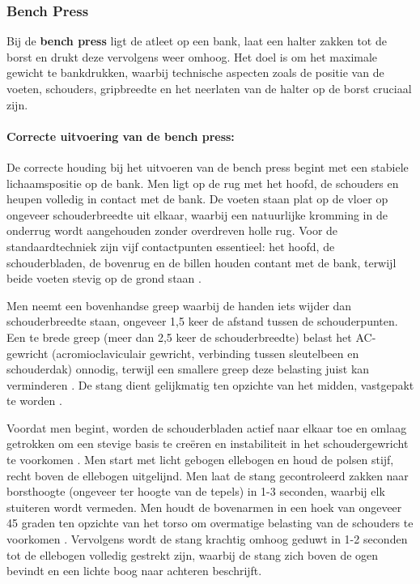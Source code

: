 \subsubsection{Bench Press}
\label{subsubsec:bench-press}
Bij de \textbf{bench press} ligt de atleet op een bank, laat een halter zakken tot de borst en drukt deze vervolgens weer omhoog. 
Het doel is om het maximale gewicht te bankdrukken, waarbij technische aspecten zoals de positie van de voeten, schouders, gripbreedte en het neerlaten van de halter op de borst cruciaal zijn.

\paragraph{Correcte uitvoering van de bench press:}
De correcte houding bij het uitvoeren van de bench press begint met een stabiele lichaamspositie op de bank. 
Men ligt op de rug met het hoofd, de schouders en heupen volledig in contact met de bank. 
De voeten staan plat op de vloer op ongeveer schouderbreedte uit elkaar, waarbij een natuurlijke kromming in de onderrug wordt aangehouden zonder overdreven holle rug. 
Voor de standaardtechniek zijn vijf contactpunten essentieel: het hoofd, de schouderbladen, de bovenrug en de billen houden contant met de bank, terwijl beide voeten stevig op de grond staan \autocite{KrolEtAl2010}.

\medskip

Men neemt een bovenhandse greep waarbij de handen iets wijder dan schouderbreedte staan, ongeveer 1,5 keer de afstand tussen de schouderpunten. 
Een te brede greep (meer dan 2,5 keer de schouderbreedte) belast het AC-gewricht (acromioclaviculair gewricht, verbinding tussen sleutelbeen en schouderdak) onnodig, terwijl een smallere greep deze belasting juist kan verminderen \autocite{Ronai2018}. 
De stang dient gelijkmatig ten opzichte van het midden, vastgepakt te worden \autocite{KrolEtAl2010}.

\medskip

Voordat men begint, worden de schouderbladen actief naar elkaar toe en omlaag getrokken om een stevige basis te creëren en instabiliteit in het schoudergewricht te voorkomen \autocite{NoteboomEtAl2024}. 
Men start met licht gebogen ellebogen en houd de polsen stijf, recht boven de ellebogen uitgelijnd. 
Men laat de stang gecontroleerd zakken naar borsthoogte (ongeveer ter hoogte van de tepels) in 1-3 seconden, waarbij elk stuiteren wordt vermeden. 
Men houdt de bovenarmen in een hoek van ongeveer 45 graden ten opzichte van het torso om overmatige belasting van de schouders te voorkomen \autocite{Ronai2018}. 
Vervolgens wordt de stang krachtig omhoog geduwt in 1-2 seconden tot de ellebogen volledig gestrekt zijn, waarbij de stang zich boven de ogen bevindt en een lichte boog naar achteren beschrijft.

